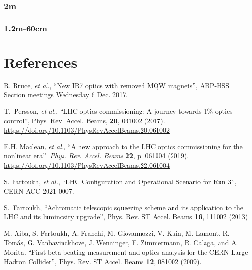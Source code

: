 \documentclass{cernatsnote}
\begin{document}
\subsubsection{2m}
\subsubsection{1.2m-60cm}


\section{References}
\begin{thebibliography}{99} %


 R. Bruce, {\it et al.}, ``New IR7 optics with removed MQW magnets'',  \href{https://indico.cern.ch/event/681507/contributions/2814548/attachments/1570845/2478033/2017.12.06--HSS_meeting_MQW_removal.pdf}{ABP-HSS Section meetings
Wednesday 6 Dec. 2017}.

 T.~Persson, {\it et al.}, ``LHC optics commissioning: A journey towards 1$\%$ optics control'', Phys. Rev. Accel. Beams, \textbf{20}, 061002 (2017).
\url{https://doi.org/10.1103/PhysRevAccelBeams.20.061002}

 E.H. Maclean, {\it et al.}, ``A new approach to the LHC optics commissioning for the nonlinear era'', {\it Phys. Rev. Accel. Beams}  {\bf 22}, p. 061004 (2019).\vspace{-0.03cm}
\url{https://doi.org/10.1103/PhysRevAccelBeams.22.061004}

 S. Fartoukh, {\it et al.}, 
	``LHC Configuration and Operational Scenario for Run 3'', CERN-ACC-2021-0007.
	
S.~Fartoukh, ``Achromatic telescopic squeezing scheme and its application to the LHC and its luminosity upgrade'', Phys. Rev. ST Accel. Beams {\bf16}, 111002 (2013)

 M. Aiba, S. Fartoukh, A. Franchi, M. Giovannozzi, V. Kain, M. Lamont, R. Tom\'as, G. Vanbavinckhove, J. Wenninger, F. Zimmermann, R. Calaga, and A. Morita, ``First beta-beating measurement and optics analysis for the CERN Large Hadron Collider'', Phys. Rev. ST Accel. Beams {\bf12}, 081002 (2009).



\end{thebibliography}
\end{document}
